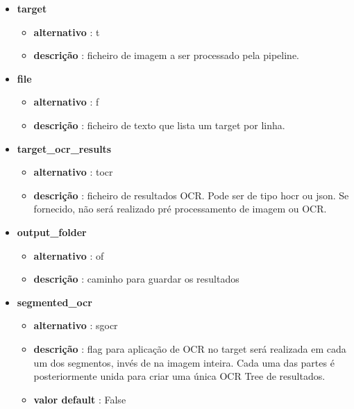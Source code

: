 \begin{itemize}\setlength\itemsep{-0.8em}
	\item \textbf{target} 
		\begin{itemize}\setlength\itemsep{-0.5em}
			\item \textbf{alternativo} : t
			\item \textbf{descrição} : ficheiro de imagem a ser processado pela pipeline.
		\end{itemize}
		
	\item \textbf{file}
		\begin{itemize}\setlength\itemsep{-0.5em}
			\item \textbf{alternativo} : f
			\item \textbf{descrição} : ficheiro de texto que lista um target por linha.
		\end{itemize}
		
	\item \textbf{target\_ocr\_results} 
		\begin{itemize}\setlength\itemsep{-0.5em}
			\item \textbf{alternativo} : tocr
			\item \textbf{descrição} : ficheiro de resultados OCR. Pode ser de tipo hocr ou json. Se fornecido, não será realizado pré processamento de imagem ou OCR.
		\end{itemize}
		
	\item \textbf{output\_folder}
		\begin{itemize}\setlength\itemsep{-0.5em}
			\item \textbf{alternativo} : of
			\item \textbf{descrição} : caminho para guardar os resultados
		\end{itemize}
		
	
	\item \textbf{segmented\_ocr}
		\begin{itemize}\setlength\itemsep{-0.5em}
			\item \textbf{alternativo} : sgocr
			\item \textbf{descrição} : flag para aplicação de OCR no target será realizada em cada um dos segmentos, invés de na imagem inteira. Cada uma das partes é posteriormente unida para criar uma única OCR Tree de resultados.
			\item \textbf{valor default} : False
		\end{itemize}
		

\end{itemize}

